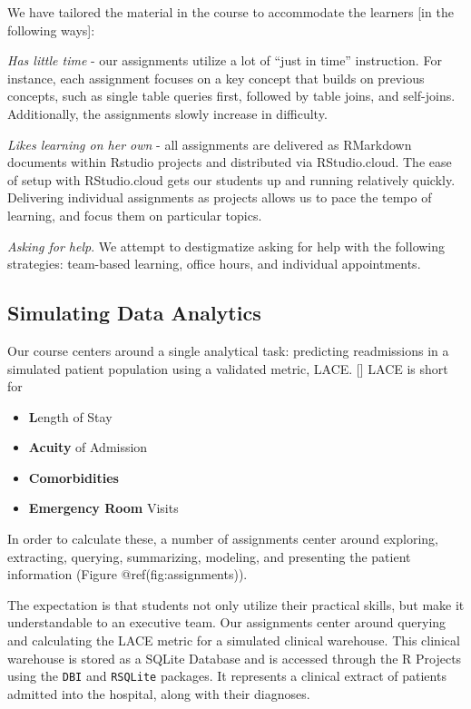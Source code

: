 We have tailored the material in the course to accommodate the learners
{[}in the following ways{]}:

\emph{Has little time} - our assignments utilize a lot of ``just in
time'' instruction. For instance, each assignment focuses on a key
concept that builds on previous concepts, such as single table queries
first, followed by table joins, and self-joins. Additionally, the
assignments slowly increase in difficulty.

\emph{Likes learning on her own} - all assignments are delivered as
RMarkdown documents within Rstudio projects and distributed via
RStudio.cloud. The ease of setup with RStudio.cloud gets our students up
and running relatively quickly. Delivering individual assignments as
projects allows us to pace the tempo of learning, and focus them on
particular topics.

\emph{Asking for help}. We attempt to destigmatize asking for help with
the following strategies: team-based learning, office hours, and
individual appointments.

\hypertarget{simulating-data-analytics}{%
\subsection{Simulating Data Analytics}\label{simulating-data-analytics}}

Our course centers around a single analytical task: predicting
readmissions in a simulated patient population using a validated metric,
LACE. {[}{]} LACE is short for

\begin{itemize}
\tightlist
\item
  \textbf{L}ength of Stay
\item
  \textbf{Acuity} of Admission
\item
  \textbf{Comorbidities}
\item
  \textbf{Emergency Room} Visits
\end{itemize}

In order to calculate these, a number of assignments center around
exploring, extracting, querying, summarizing, modeling, and presenting
the patient information (Figure @ref(fig:assignments)).

The expectation is that students not only utilize their practical
skills, but make it understandable to an executive team. Our assignments
center around querying and calculating the LACE metric for a simulated
clinical warehouse. This clinical warehouse is stored as a SQLite
Database and is accessed through the R Projects using the \texttt{DBI}
and \texttt{RSQLite} packages. It represents a clinical extract of
patients admitted into the hospital, along with their diagnoses.

